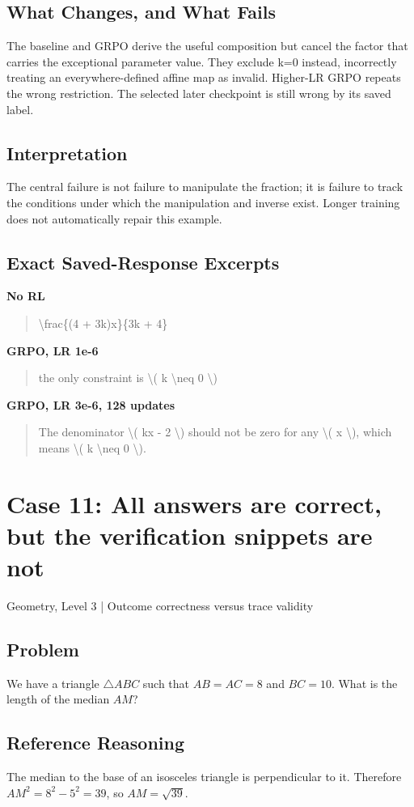 \documentclass[10pt,letterpaper]{article}
\begin{document}
\subsection*{What Changes, and What Fails}
The baseline and GRPO derive the useful composition but cancel the factor that carries the exceptional parameter value. They exclude k=0 instead, incorrectly treating an everywhere-defined affine map as invalid. Higher-LR GRPO repeats the wrong restriction. The selected later checkpoint is still wrong by its saved label.
\subsection*{Interpretation}
The central failure is not failure to manipulate the fraction; it is failure to track the conditions under which the manipulation and inverse exist. Longer training does not automatically repair this example.
\subsection*{Exact Saved-Response Excerpts}
\textbf{No RL}
\begin{quote}\small\raggedright \textbackslash{}frac\{(4 + 3k)x\}\{3k + 4\}\end{quote}
\textbf{GRPO, LR 1e-6}
\begin{quote}\small\raggedright the only constraint is \textbackslash{}( k \textbackslash{}neq 0 \textbackslash{})\end{quote}
\textbf{GRPO, LR 3e-6, 128 updates}
\begin{quote}\small\raggedright The denominator \textbackslash{}( kx - 2 \textbackslash{}) should not be zero for any \textbackslash{}( x \textbackslash{}), which means \textbackslash{}( k \textbackslash{}neq 0 \textbackslash{}).\end{quote}
\clearpage\section*{Case 11: All answers are correct, but the verification snippets are not}
Geometry, Level 3 | Outcome correctness versus trace validity
\subsection*{Problem}
We have a triangle $\triangle ABC$ such that $AB = AC = 8$ and $BC = 10.$ What is the length of the median $AM$?
\subsection*{Reference Reasoning}
The median to the base of an isosceles triangle is perpendicular to it. Therefore $AM^2=8^2-5^2=39$, so $AM=\sqrt{39}$.
\end{document}
